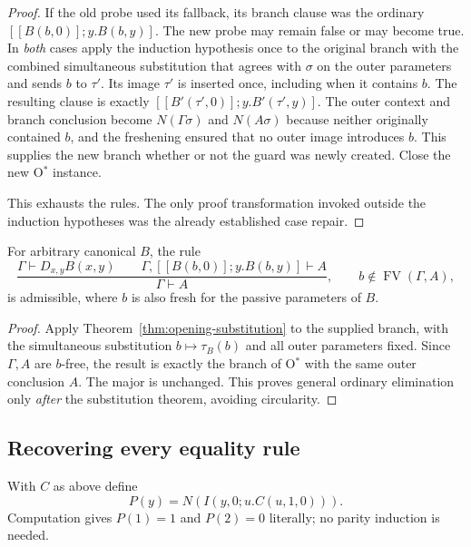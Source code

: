 \begin{proof}
If the old probe used its fallback, its branch clause was the ordinary
$[[B(b,0)];y.B(b,y)]$. The new probe may remain false or may become true.
In \emph{both} cases apply the induction hypothesis once to the original
branch with the combined simultaneous substitution that agrees with
$\sigma$ on the outer parameters and sends $b$ to $\tau'$. Its image
$\tau'$ is inserted once, including when it contains $b$. The resulting
clause is exactly
$[[B'(\tau',0)];y.B'(\tau',y)]$. The outer context and branch conclusion
become $N(\Gamma\sigma)$ and $N(A\sigma)$ because neither originally
contained $b$, and the freshening ensured that no outer image introduces
$b$. This supplies the new branch whether or not the guard was newly
created. Close the new O$^*$ instance.

This exhausts the rules. The only proof transformation invoked outside
the induction hypotheses was the already established case repair.
\end{proof}

\begin{corollary}
\label{cor:opening-ordinary}
For arbitrary canonical $B$, the rule
\[
 \frac{\Gamma\vdash D_{x,y}B(x,y)\qquad
       \Gamma,[[B(b,0)];y.B(b,y)]\vdash A}
      {\Gamma\vdash A},\qquad
 b\notin\operatorname{FV}(\Gamma,A),
\]
is admissible, where $b$ is also fresh for the passive parameters of $B$.
\end{corollary}
\begin{proof}
Apply Theorem~\ref{thm:opening-substitution} to the supplied branch,
with the simultaneous substitution $b\mapsto\tau_B(b)$ and all outer
parameters fixed. Since $\Gamma,A$ are $b$-free, the result is exactly
the branch of O$^*$ with the same outer conclusion $A$.
The major is unchanged. This proves general ordinary elimination only
\emph{after} the substitution theorem, avoiding circularity.
\end{proof}

\subsection{Recovering every equality rule}

With $C$ as above define
\[
 P(y)=N(I(y,0;u.C(u,1,0))).
\]
Computation gives $P(1)=1$ and $P(2)=0$ literally; no parity induction is
needed.

